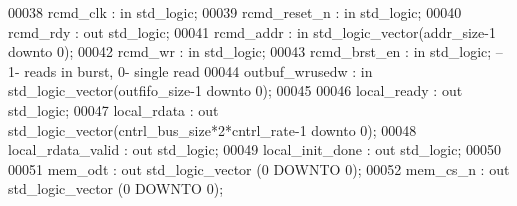\begin{DoxyCode}
00038         \textcolor{vhdlchar}{rcmd_clk}                \textcolor{vhdlchar}{:} \textcolor{keywordflow}{in} \textcolor{comment}{std\_logic};
00039         \textcolor{vhdlchar}{rcmd_reset_n}        \textcolor{vhdlchar}{:} \textcolor{keywordflow}{in}  \textcolor{comment}{std\_logic};
00040         \textcolor{vhdlchar}{rcmd_rdy}                \textcolor{vhdlchar}{:} \textcolor{keywordflow}{out} \textcolor{comment}{std\_logic};
00041         \textcolor{vhdlchar}{rcmd_addr}           \textcolor{vhdlchar}{:} \textcolor{keywordflow}{in} \textcolor{comment}{std\_logic\_vector}\textcolor{vhdlchar}{(}\textcolor{vhdlchar}{addr_size}\textcolor{vhdlchar}{-}\textcolor{vhdllogic}{}\textcolor{vhdllogic}{1} \textcolor{keywordflow}{downto} \textcolor{vhdllogic}{}\textcolor{vhdllogic}{0}\textcolor{vhdlchar}{)};
00042         \textcolor{vhdlchar}{rcmd_wr}             \textcolor{vhdlchar}{:} \textcolor{keywordflow}{in} \textcolor{comment}{std\_logic};
00043         \textcolor{vhdlchar}{rcmd_brst_en}        \textcolor{vhdlchar}{:} \textcolor{keywordflow}{in} \textcolor{comment}{std\_logic};\textcolor{keyword}{ --1- reads in burst, 0- single read}
00044         \textcolor{vhdlchar}{outbuf_wrusedw}      \textcolor{vhdlchar}{:} \textcolor{keywordflow}{in} \textcolor{comment}{std\_logic\_vector}\textcolor{vhdlchar}{(}\textcolor{vhdlchar}{outfifo_size}\textcolor{vhdlchar}{-}\textcolor{vhdllogic}{}\textcolor{vhdllogic}{1} \textcolor{keywordflow}{downto} \textcolor{vhdllogic}{}\textcolor{vhdllogic}{0}\textcolor{vhdlchar}{)};
00045 
00046         local\_ready         : \textcolor{keywordflow}{out} \textcolor{comment}{std\_logic};
00047         local\_rdata         : \textcolor{keywordflow}{out} \textcolor{comment}{std\_logic\_vector}(cntrl\_bus\_size*2*cntrl\_rate-1 \textcolor{keywordflow}{downto} \textcolor{vhdllogic}{0});
00048         local\_rdata\_valid   : \textcolor{keywordflow}{out} \textcolor{comment}{std\_logic};
00049         local\_init\_done : \textcolor{keywordflow}{out} \textcolor{comment}{std\_logic};
00050 
00051         \textcolor{vhdlchar}{mem_odt}             \textcolor{vhdlchar}{:} \textcolor{keywordflow}{out} \textcolor{comment}{std\_logic\_vector} \textcolor{vhdlchar}{(}\textcolor{vhdllogic}{}\textcolor{vhdllogic}{0} \textcolor{keywordflow}{DOWNTO} \textcolor{vhdllogic}{}\textcolor{vhdllogic}{0}\textcolor{vhdlchar}{)};
00052         \textcolor{vhdlchar}{mem_cs_n}                \textcolor{vhdlchar}{:} \textcolor{keywordflow}{out} \textcolor{comment}{std\_logic\_vector} \textcolor{vhdlchar}{(}\textcolor{vhdllogic}{}\textcolor{vhdllogic}{0} \textcolor{keywordflow}{DOWNTO} \textcolor{vhdllogic}{}\textcolor{vhdllogic}{0}\textcolor{vhdlchar}{)};

\end{DoxyCode}
